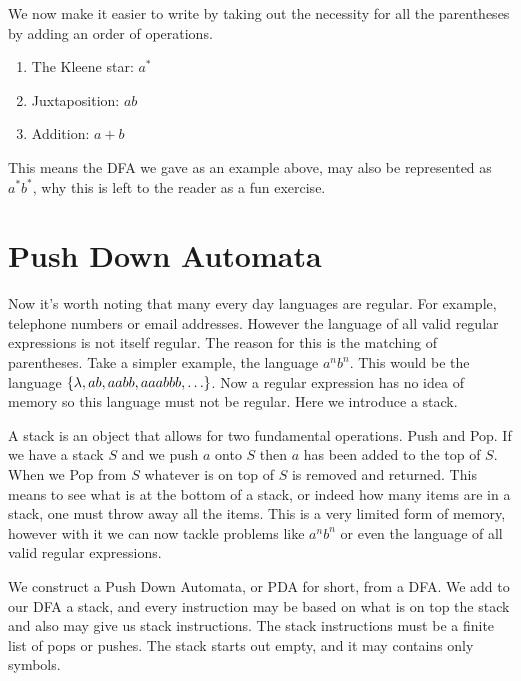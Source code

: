 \documentclass{article}
\begin{document}
	We now make it easier to write by taking out the necessity for all the parentheses by adding an order of operations.
	\begin{enumerate}
		\item The Kleene star: $a^*$
		\item Juxtaposition: $ab$
		\item Addition: $a+b$
	\end{enumerate}
	This means the DFA we gave as an example above, may also be represented as $a^*b^*$, why this is left to the reader as a fun exercise. 
	
	\section{Push Down Automata}
	Now it's worth noting that many every day languages are regular. For example, telephone numbers or email addresses. However the language of all valid regular expressions is not itself regular. The reason for this is the matching of parentheses. Take a simpler example, the language $a^nb^n$. This would be the language $\left\{ {\lambda, ab, aabb, aaabbb, \ldots} \right\}$. Now a regular expression has no idea of memory so this language must not be regular. Here we introduce a stack.
	
	A stack is an object that allows for two fundamental operations. Push and Pop. If we have a stack $S$ and we push $a$ onto $S$ then $a$ has been added to the top of $S$. When we Pop from $S$ whatever is on top of $S$ is removed and returned. This means to see what is at the bottom of a stack, or indeed how many items are in a stack, one must throw away all the items. This is a very limited form of memory, however with it we can now tackle problems like $a^nb^n$ or even the language of all valid regular expressions.
	
	We construct a Push Down Automata, or PDA for short, from a DFA. We add to our DFA a stack, and every instruction may be based on what is on top the stack and also may give us stack instructions. The stack instructions must be a finite list of pops or pushes. The stack starts out empty, and it may contains only symbols.
	
\end{document}

